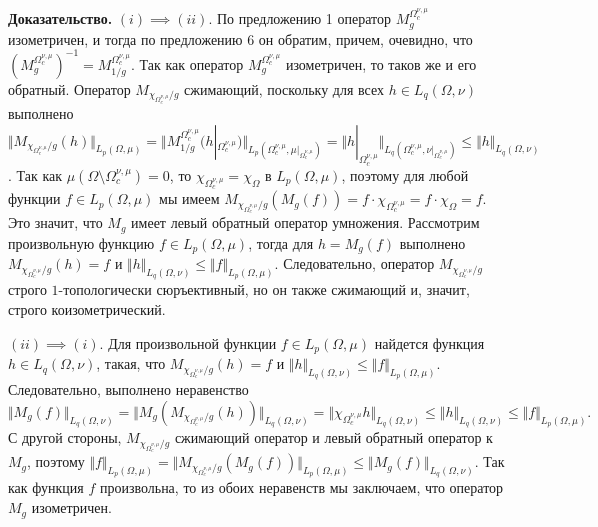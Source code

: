 \documentclass[11pt,twoside]{article}
\begin{document}
\textbf{Доказательство.} $(i)$$\implies$$ (ii)$. По предложению 1 оператор
    $M_g^{\Omega_c^{\nu,\mu}}$ изометричен, и тогда по предложению 6 он обратим,
        причем, очевидно, что
    ${(M_g^{\Omega_c^{\nu,\mu}})}^{-1}=M_{1/g}^{\Omega_c^{\nu,\mu}}$. Так как
        оператор $M_g^{\Omega_c^{\nu,\mu}}$ изометричен, то таков же и его обратный.
        Оператор $M_{\chi_{\Omega_c^{\nu,\mu}}/g}$ сжимающий, поскольку для всех
    $h\in L_q(\Omega,\nu)$ выполнено $\Vert
    M_{\chi_{\Omega_c^{\nu,\mu}}/g}(h)\Vert_{L_p(\Omega,\mu)} = \Vert
    M_{1/g}^{\Omega_c^{\nu,\mu}}(h|_{\Omega_c^{\nu,\mu}})
    \Vert_{L_p(\Omega_c^{\nu,\mu},\mu|_{\Omega_c^{\nu,\mu}})} =\Vert
    h|_{\Omega_c^{\nu,\mu}}
    \Vert_{L_q(\Omega_c^{\nu,\mu},\nu|_{\Omega_c^{\nu,\mu}})} \leq \Vert h
    \Vert_{L_q(\Omega,\nu)}$. Так как
    $\mu(\Omega\setminus\Omega_c^{\nu,\mu})=0$, то
    $\chi_{\Omega_c^{\nu,\mu}}=\chi_{\Omega}$ в $L_p(\Omega,\mu)$, поэтому для
        любой функции $f\in L_p(\Omega,\mu)$ мы имеем
    $M_{\chi_{\Omega_c^{\nu,\mu}}/g}(M_g(f))
    =f\cdot\chi_{\Omega_c^{\nu,\mu}}=f\cdot\chi_{\Omega}=f$. Это значит, что
    $M_g$ имеет левый обратный оператор умножения. Рассмотрим произвольную
        функцию $f\in L_p(\Omega,\mu)$, тогда для $h=M_g(f)$ выполнено
    $M_{\chi_{\Omega_c^{\nu,\mu}}/g}(h)=f$ и $\Vert
    h\Vert_{L_q(\Omega,\nu)}\leq\Vert f\Vert_{L_p(\Omega,\mu)}$. Следовательно,
        оператор $M_{\chi_{\Omega_c^{\nu,\mu}}/g}$ строго $1$-топологически
        сюръективный, но он также сжимающий и, значит, строго коизометрический.

    $(ii)$$\implies$$ (i)$. Для произвольной функции $f\in L_p(\Omega,\mu)$
        найдется функция  $h\in L_q(\Omega,\nu)$, такая, что
    $M_{\chi_{\Omega_c^{\nu,\mu}}/g}(h)=f$ и $\Vert
    h\Vert_{L_q(\Omega,\nu)}\leq \Vert f\Vert_{L_p(\Omega,\mu)}$.
Следовательно, выполнено неравенство
$$
    \Vert M_g(f)\Vert_{L_q(\Omega,\nu)}
    =\Vert M_g(M_{\chi_{\Omega_c^{\nu,\mu}}/g}(h))\Vert_{L_q(\Omega,\nu)}
    =\Vert \chi_{\Omega_c^{\nu,\mu}}h\Vert_{L_q(\Omega,\nu)}
    \leq\Vert h\Vert_{L_q(\Omega,\nu)}
    \leq\Vert f\Vert_{L_p(\Omega,\mu)}.
$$
С другой стороны, $M_{\chi_{\Omega_c^{\nu,\mu}}/g}$ сжимающий оператор и левый
обратный оператор к  $M_g$, поэтому $\Vert f\Vert_{L_p(\Omega,\mu)} =\Vert
    M_{\chi_{\Omega_c^{\nu,\mu}}/g}(M_g(f))\Vert_{L_p(\Omega,\mu)} \leq\Vert
    M_g(f)\Vert_{L_q(\Omega,\nu)}$. Так как функция $f$ произвольна, то из обоих
неравенств мы заключаем, что оператор $M_g$ изометричен.
\end{document}
